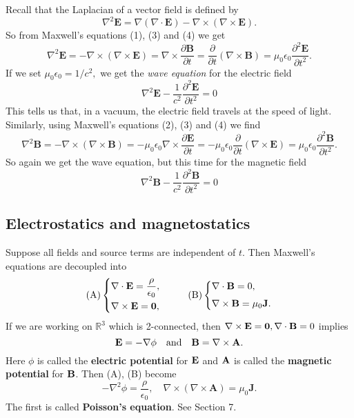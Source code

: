 Recall that the Laplacian of a vector field is defined by
\[
    \nabla^{2} \mathbf{E}=\nabla(\nabla \cdot \mathbf{E})-\nabla \times(\nabla \times \mathbf{E}).
\]
So from Maxwell's equations (1), (3) and (4) we get
\[
    \nabla^{2} \mathbf{E}=-\nabla \times(\nabla \times \mathbf{E})=\nabla \times \frac{\partial \mathbf{B}}{\partial t}=\frac{\partial}{\partial t}(\nabla \times \mathbf{B})=\mu_{0} \epsilon_{0} \frac{\partial^{2} \mathbf{E}}{\partial t^{2}}.
\]
If we set $\mu_{0} \epsilon_{0}=1 / c^{2},$ we get the \textit{wave equation} for the electric field
\[
    \boxed{\nabla^{2} \mathbf{E}-\frac{1}{c^{2}} \frac{\partial^{2} \mathbf{E}}{\partial t^{2}}=0}
\]
This tells us that, in a vacuum, the electric field travels at the speed of light. Similarly, using Maxwell's equations (2), (3) and (4) we find
\[
    \nabla^{2} \mathbf{B}=-\nabla \times(\nabla \times \mathbf{B})=-\mu_{0} \epsilon_{0} \nabla \times \frac{\partial \mathbf{E}}{\partial t}=-\mu_{0} \epsilon_{0} \frac{\partial}{\partial t}(\nabla \times \mathbf{E})=\mu_{0} \epsilon_{0} \frac{\partial^{2} \mathbf{B}}{\partial t^{2}}.
\]
So again we get the wave equation, but this time for the magnetic field
\[
    \boxed{\nabla^{2} \mathbf{B}-\frac{1}{c^{2}} \frac{\partial^{2} \mathbf{B}}{\partial t^{2}}=0}
\]

\subsection{Electrostatics and magnetostatics}
Suppose all fields and source terms are independent of $t$. Then Maxwell's equations are decoupled into 
\[
    (\text{A})\left\{ \begin{aligned}
         &\nabla\cdot{\bf E} = \frac{\rho}{\epsilon_0},\\ 
         &\nabla\times{\bf E} = \mathbf{0},
    \end{aligned} \right. ~~~~~~~~ (\text{B})\left\{ \begin{aligned}
        &\nabla\cdot{\bf B} = 0,\\[3pt]
        &\nabla\times{\bf B} = \mu_0{\bf J}.
   \end{aligned} \right.
\]
If we are working on $ \mathbb{R}^{3} $ which is 2-connected, then $ \nabla\times{\bf E} = \mathbf{0},\nabla\cdot{\bf B}=0 $ implies 
\[
    {\bf E} = - \nabla\phi\quad \text{and}\quad {\bf B} = \nabla\times{\bf A}.
\]
Here $ \phi $ is called the \textbf{electric potential} for ${\bf E}$ and $ {\bf A} $ is called the \textbf{magnetic potential} for $ {\bf B} $. Then (A), (B) become
\[
    -\nabla^{2} \phi=\frac{\rho}{\epsilon_{0}}, \quad \nabla \times(\nabla \times \mathbf{A})=\mu_{0} \mathbf{J}.
\]
The first is called \textbf{Poisson's equation}. See Section 7.

